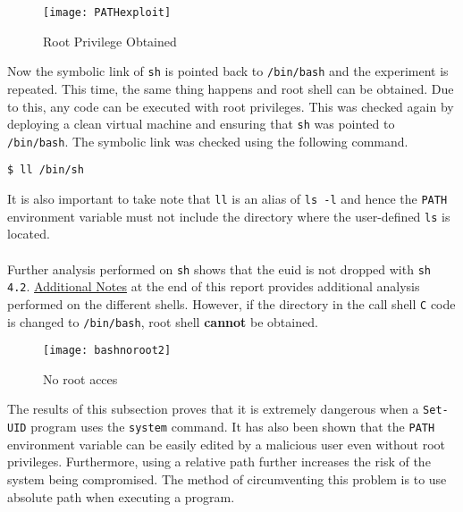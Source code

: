 \documentclass[a4paper,12pt]{article}
\begin{document}
\begin{figure}[H]
	\centering
	\texttt{[image: PATHexploit]}
	\caption{Root Privilege Obtained}
	\label{fig:pathexploit}
\end{figure}
\noindent Now the symbolic link of \texttt{sh} is pointed back to \texttt{/bin/bash} and the experiment is repeated. This time, the same thing happens and root shell can be obtained. Due to this, any code can be executed with root privileges. This was checked again by deploying a clean virtual machine and ensuring that \texttt{sh} was pointed to \texttt{/bin/bash}. The symbolic link was checked using the following command.
\begin{verbatim}
$ ll /bin/sh
\end{verbatim}
It is also important to take note that \texttt{ll} is an alias of \texttt{ls -l} and hence the \texttt{PATH} environment variable must not include the directory where the user-defined \texttt{ls} is located.
\\\\ Further analysis performed on \texttt{sh} shows that the euid is not dropped with \texttt{sh 4.2}. \hyperref[addnotes]{Additional Notes} at the end of this report provides additional analysis performed on the different shells. However, if the directory in the call shell \texttt{C} code is changed to \texttt{/bin/bash}, root shell \textbf{cannot} be obtained.
\begin{figure}[H]
	\centering
	\texttt{[image: bashnoroot2]}
	\caption{No root acces}
	\label{fig:bashnoroot2}
\end{figure}

\noindent The results of this subsection proves that it is extremely dangerous when a \texttt{Set-UID} program uses the \texttt{system} command. It has also been shown that the \texttt{PATH} environment variable can be easily edited by a malicious user even without root privileges. Furthermore, using a relative path further increases the risk of the system being compromised. The method of circumventing this problem is to use absolute path when executing a program.
\end{document}
